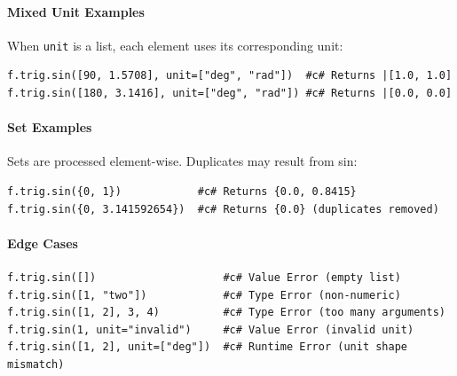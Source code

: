 \paragraph{Mixed Unit Examples}
When \texttt{unit} is a list, each element uses its corresponding unit:
\begin{verbatim}
f.trig.sin([90, 1.5708], unit=["deg", "rad"])  #c# Returns |[1.0, 1.0]
f.trig.sin([180, 3.1416], unit=["deg", "rad"]) #c# Returns |[0.0, 0.0]
\end{verbatim}

\paragraph{Set Examples}
Sets are processed element-wise. Duplicates may result from sin:
\begin{verbatim}
f.trig.sin({0, 1})            #c# Returns {0.0, 0.8415}
f.trig.sin({0, 3.141592654})  #c# Returns {0.0} (duplicates removed)
\end{verbatim}

\paragraph{Edge Cases}
\begin{verbatim}
f.trig.sin([])                    #c# Value Error (empty list)
f.trig.sin([1, "two"])            #c# Type Error (non-numeric)
f.trig.sin([1, 2], 3, 4)          #c# Type Error (too many arguments)
f.trig.sin(1, unit="invalid")     #c# Value Error (invalid unit)
f.trig.sin([1, 2], unit=["deg"])  #c# Runtime Error (unit shape mismatch)
\end{verbatim}

